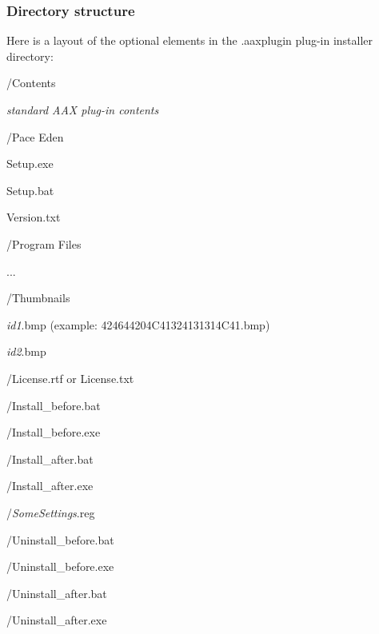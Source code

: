 \hypertarget{a00377_subsection__aax_venue_guide__installer__format}{}\subsubsection{Directory structure}\label{a00377_subsection__aax_venue_guide__installer__format}
 Here is a layout of the optional elements in the .aaxplugin plug-\/in installer directory\+: 
\begin{DoxyItemize}
\item /\+Contents 
\begin{DoxyItemize}
\item {\itshape standard A\+A\+X plug-\/in contents} 
\end{DoxyItemize}
\item /\+Pace Eden 
\begin{DoxyItemize}
\item Setup.\+exe  
\item Setup.\+bat  
\item Version.\+txt  
\end{DoxyItemize}
\item /\+Program Files 
\begin{DoxyItemize}
\item ...  
\end{DoxyItemize}
\item /\+Thumbnails 
\begin{DoxyItemize}
\item {\itshape id1}.bmp (example\+: 424644204\+C41324131314\+C41.\+bmp)  
\item {\itshape id2}.bmp  
\end{DoxyItemize}
\item /\+License.rtf or License.\+txt  
\item /\+Install\+\_\+before.bat  
\item /\+Install\+\_\+before.exe  
\item /\+Install\+\_\+after.bat  
\item /\+Install\+\_\+after.exe  
\item /{\itshape Some\+Settings}.reg  
\item /\+Uninstall\+\_\+before.bat  
\item /\+Uninstall\+\_\+before.exe  
\item /\+Uninstall\+\_\+after.bat  
\item /\+Uninstall\+\_\+after.exe  
\end{DoxyItemize}

